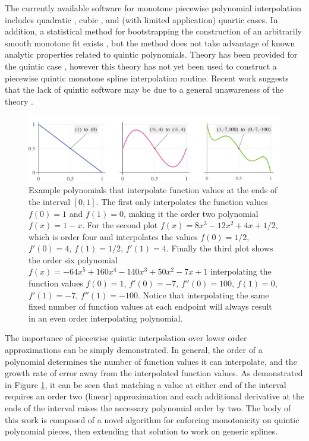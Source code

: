 \documentclass{scspaperproc}
\theoremstyle{scsthe}
\begin{document}
The currently available software for monotone piecewise polynomial interpolation includes quadratic \cite{he1998monotone}, cubic \cite{fritsch1980monotone}, and (with limited application) quartic \cite{wang2004rational,piah2011improved,yao2018unconditionally} cases. In addition, a statistical method for bootstrapping the construction of an arbitrarily smooth monotone fit exists \cite{leitenstorfer2006generalized}, but the method does not take advantage of known analytic properties related to quintic polynomials. Theory has been provided for the quintic case \cite{ulrich1994positivity,hess1994positive}, however this theory has not yet been used to construct a piecewise quintic monotone spline interpolation routine. Recent work suggests that the lack of quintic software may be due to a general unawareness of the theory .

\begin{figure}
  \centering
  \includegraphics[width=.9\textwidth]{spline-demonstration}
  \caption{Example polynomials that interpolate function values at the ends of the interval $[0,1]$. The first only interpolates the function values $f(0) = 1$ and $f(1) = 0$, making it the order two polynomial $f(x) = 1 - x$. For the second plot $f(x) = 8x^3 - 12x^2 + 4x + 1/2$, which is order four and interpolates the values $f(0) = 1/2$, $f'(0) = 4$, $f(1) = 1/2$, $f'(1) = 4$. Finally the third plot shows the order six polynomial $f(x) = - 64x^5 + 160x^4 - 140x^3 + 50x^2 - 7x + 1$ interpolating the function values $f(0) = 1$, $f'(0) = -7$, $f''(0) = 100$, $f(1) = 0$, $f'(1) = -7$, $f''(1) = -100$. Notice that interpolating the same fixed number of function values at each endpoint will always result in an even order interpolating polynomial.
  }\label{fig:spline-demonstration}
\end{figure}

The importance of piecewise quintic interpolation over lower order approximations can be simply demonstrated. In general, the order of a polynomial determines the number of function values it can interpolate, and the growth rate of error away from the interpolated function values. As demonstrated in Figure \ref{fig:spline-demonstration}, it can be seen that matching a value at either end of the interval requires an order two (linear) approximation and each additional derivative at the ends of the interval raises the necessary polynomial order by two. The body of this work is composed of a novel algorithm for enforcing monotonicity on quintic polynomial pieces, then extending that solution to work on generic splines.
\end{document}
